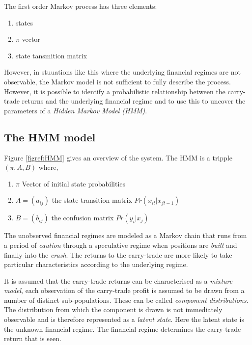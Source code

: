 \documentclass[12pt, a4paper, oneside]{article} %
\begin{document}
The first order Markov process has three elements: 
\begin{enumerate}
\item states
\item $\pi$ vector
\item state tansmition matrix
\end{enumerate}

However, in stuuations like this where the underlying financial regimes are not observable, the Markov model is not sufficient to fully describe the process. However, it is possible to identify a probabilistic relationship between the carry-trade returns and the underlying financial regime and to use this to uncover the parameters of a \emph{Hidden Markov Model (HMM)}. 
 

\subsection{The HMM model}
Figure \ref{figref:HMM} gives an overview of the system.  The HMM is a tripple $(\pi, A, B)$ where,

\begin{enumerate}
\item $\pi$ Vector of initial state probabilities
\item $A = (a_{ij})$ the state transition matrix $Pr(x_{it}|x_{jt-1})$
\item $B = (b_{ij})$ the confusion matrix $Pr(y_i|x_j)$
\end{enumerate}

The unobserved financial regimes are modeled as a Markov chain that runs from a period of \emph{caution} through a speculative regime when positions are \emph{built} and finally into the \emph{crash}.  The returns to the carry-trade are more likely to take particular characteristics according to the underlying regime.   

It is assumed that the carry-trade returns can be characterised as a \emph{mixture model}, each observation of the carry-trade profit is assumed to be drawn from a number of distinct sub-populations.  These can be called \emph{component distributions}.  The distribution from which the component is drawn is not immediately observable and is therefore represented as a \emph{latent state}.  Here the latent state is the unknown financial regime.  The financial regime determines the carry-trade return that is seen. 
\end{document}
